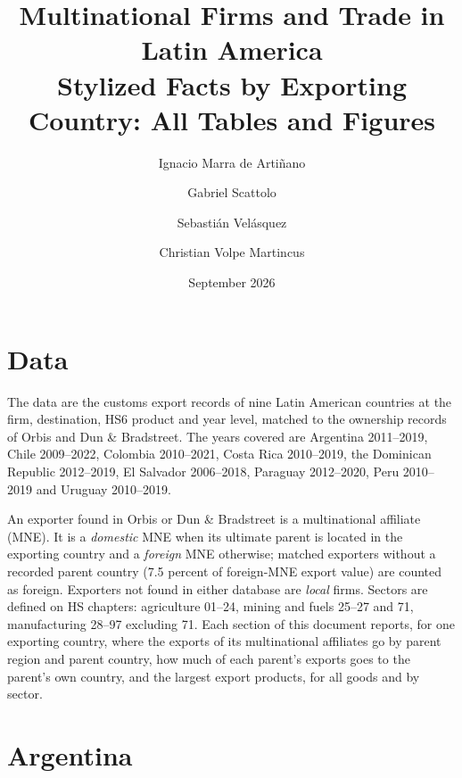 \documentclass[11pt,a4paper]{article}
\title{Multinational Firms and Trade in Latin America\\[4pt]\large Stylized Facts by Exporting Country: All Tables and Figures}
\author{Ignacio Marra de Arti\~nano \and Gabriel Scattolo \and Sebasti\'an Vel\'asquez \and Christian Volpe Martincus}
\date{September 2026}
\begin{document}
\maketitle
\tableofcontents
\clearpage

\section*{Data}

The data are the customs export records of nine Latin American countries at the firm, destination,
HS6 product and year level, matched to the ownership records of Orbis and Dun \& Bradstreet. The
years covered are Argentina 2011--2019, Chile 2009--2022, Colombia 2010--2021, Costa Rica
2010--2019, the Dominican Republic 2012--2019, El Salvador 2006--2018, Paraguay 2012--2020, Peru
2010--2019 and Uruguay 2010--2019.

An exporter found in Orbis or Dun \& Bradstreet is a multinational affiliate (MNE). It is a
\emph{domestic} MNE when its ultimate parent is located in the exporting country and a
\emph{foreign} MNE otherwise; matched exporters without a recorded parent country (7.5 percent of
foreign-MNE export value) are counted as foreign. Exporters not found in either database are
\emph{local} firms. Sectors are defined on HS chapters: agriculture 01--24, mining and fuels
25--27 and 71, manufacturing 28--97 excluding 71.
Each section of this document reports, for one exporting country, where the exports of its
multinational affiliates go by parent region and parent country, how much of each parent's exports
goes to the parent's own country, and the largest export products, for all goods and by sector.


\section{Argentina}\label{sec:c_ARG}
\end{document}
